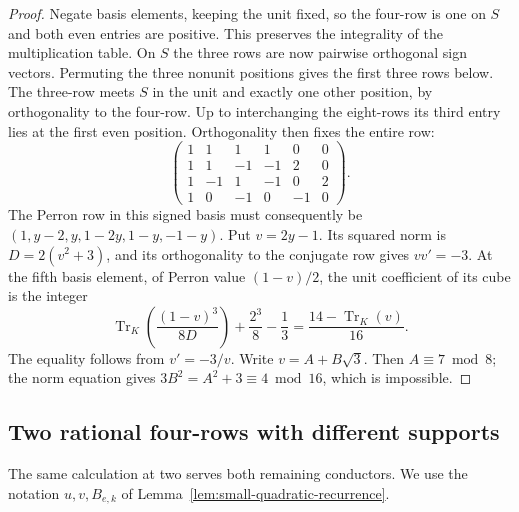 \documentclass[11pt,reqno]{amsart}
\theoremstyle{remark}\newtheorem{remark}[theorem]{Remark}
\numberwithin{equation}{section}
\begin{document}
\begin{proof}
Negate basis elements, keeping the unit fixed, so the four-row is
one on $S$ and both even entries are positive. This preserves the
integrality of the multiplication table. On $S$ the three rows are
now pairwise orthogonal sign vectors. Permuting the three nonunit
positions gives the first three rows below. The three-row meets $S$
in the unit and exactly one other position, by orthogonality to the
four-row. Up to interchanging the eight-rows its third entry lies at
the first even position. Orthogonality then fixes the entire row:
\[
 \begin{pmatrix}
 1& 1& 1& 1&0&0\\
 1& 1&-1&-1&2&0\\
 1&-1& 1&-1&0&2\\
 1& 0&-1& 0&-1&0
 \end{pmatrix}.
\]
The Perron row in this signed basis must consequently be
$(1,y-2,y,1-2y,1-y,-1-y)$.
Put $v=2y-1$. Its squared norm is $D=2(v^2+3)$, and its
orthogonality to the conjugate row gives $vv'=-3$.
At the fifth basis element, of Perron value $(1-v)/2$, the unit
coefficient of its cube is the integer
\[
 \operatorname{Tr}_K\!\left(\frac{(1-v)^3}{8D}\right)
          +\frac{2^3}{8}-\frac13
       =\frac{14-\operatorname{Tr}_K(v)}{16}.
\]
The equality follows from $v'=-3/v$. Write $v=A+B\sqrt3$.
Then $A\equiv7\bmod8$; the norm equation gives
$3B^2=A^2+3\equiv4\bmod16$, which is impossible.
\end{proof}

\subsection{Two rational four-rows with different supports}

The same calculation at two serves both remaining conductors. We use
the notation $u,v,B_{e,k}$ of Lemma~\ref{lem:small-quadratic-recurrence}.
\end{document}
